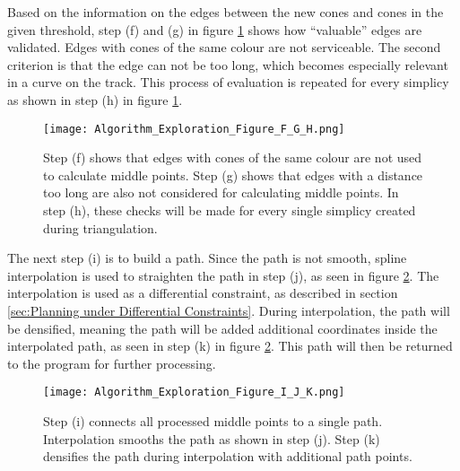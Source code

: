 Based on the information on the edges between the new cones and cones in the given threshold, step (f) and (g) in figure \ref{fig:Algorithm Exploration Figure F, G and H} shows how ``valuable'' edges are validated. Edges with cones of the same colour are not serviceable. The second criterion is that the edge can not be too long, which becomes especially relevant in a curve on the track. This process of evaluation is repeated for every simplicy as shown in step (h) in figure \ref{fig:Algorithm Exploration Figure F, G and H}.
\begin{figure}[H]
    \centering
    \texttt{[image: Algorithm\_Exploration\_Figure\_F\_G\_H.png]}
    \caption{Step (f) shows that edges with cones of the same colour are not used to calculate middle points. Step (g) shows that edges with a distance too long are also not considered for calculating middle points. In step (h), these checks will be made for every single simplicy created during triangulation.}
    \label{fig:Algorithm Exploration Figure F, G and H}
\end{figure}

The next step (i) is to build a path. Since the path is not smooth, spline interpolation is used to straighten the path in step (j), as seen in figure \ref{fig:Algorithm Exploration Figure I, J and K}. The interpolation is used as a differential constraint, as described in section \ref{sec:Planning under Differential Constraints}. During interpolation, the path will be densified, meaning the path will be added additional coordinates inside the interpolated path, as seen in step (k) in figure \ref{fig:Algorithm Exploration Figure I, J and K}. This path will then be returned to the program for further processing.
\begin{figure}[H]
    \centering
    \texttt{[image: Algorithm\_Exploration\_Figure\_I\_J\_K.png]}
    \caption{Step (i) connects all processed middle points to a single path. Interpolation smooths the path as shown in step (j). Step (k) densifies the path during interpolation with additional path points.}
    \label{fig:Algorithm Exploration Figure I, J and K}
\end{figure}

